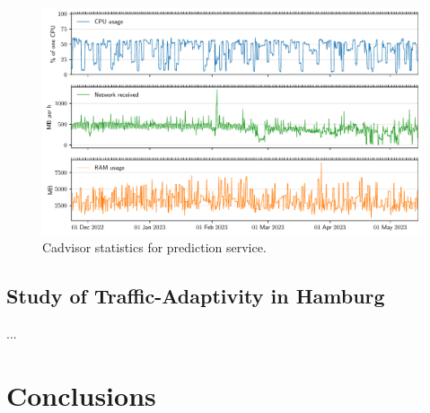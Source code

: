 \begin{figure}
    \centering
    \includegraphics[width=\linewidth]{images/monitoring-prediction-service-load.pdf}
    \caption{Cadvisor statistics for prediction service.}\label{fig:monitoring-prediction-service-load}
\end{figure}



\subsection{Study of Traffic-Adaptivity in Hamburg}

...

\section{Conclusions}
